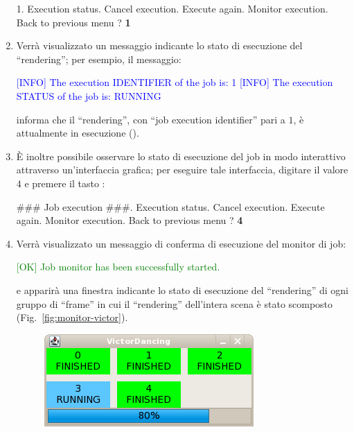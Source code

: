 \begin{enumerate}
\begin{mgCodeBox}
1. Execution status. Cancel execution. Execute again. Monitor execution. Back to previous menu\newline
? \textbf{1}
\end{mgCodeBox}
\item Verr\`a visualizzato un messaggio indicante lo stato di esecuzione del ``rendering''; per esempio, il messaggio:
\begin{mgCodeBox}
\small
\textcolor{blue}{[INFO] The execution IDENTIFIER of the job is: 1}\newline
\textcolor{blue}{[INFO] The execution STATUS of the job is: RUNNING}
\end{mgCodeBox}
informa che il ``rendering'', con ``job execution identifier'' pari a $1$, \`e attualmente in esecuzione ().
\item \`E inoltre possibile osservare lo stato di esecuzione del job in modo interattivo attraverso un'interfaccia grafica; per eseguire tale interfaccia, digitare il valore $4$ e premere il tasto :
\begin{mgCodeBox}
\small
\#\#\# Job execution \#\#\#. Execution status. Cancel execution. Execute again. Monitor execution. Back to previous menu\newline
? \textbf{4}
\end{mgCodeBox}
\item Verr\`a visualizzato un messaggio di conferma di esecuzione del monitor di job:
\begin{mgCodeBox}
\small
\textcolor{green}{[OK] Job monitor has been successfully started.}
\end{mgCodeBox}
e apparir\`a una finestra indicante lo stato di esecuzione del ``rendering'' di ogni gruppo di ``frame'' in cui il ``rendering'' dell'intera scena \`e stato scomposto (Fig.~\ref{fig:monitor-victor}).
\begin{figure}
\centering
\includegraphics{images/victor_monitor}

\end{figure}
\end{enumerate}
